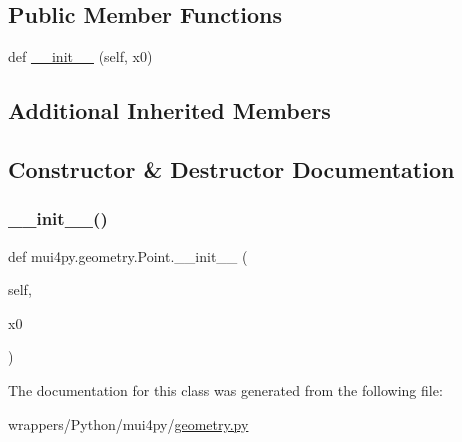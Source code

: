 \subsection*{Public Member Functions}
\begin{DoxyCompactItemize}
\item 
def \hyperlink{classmui4py_1_1geometry_1_1_point_a45dff6ac5f44fac1ee93e62908e3b563}{\+\_\+\+\_\+init\+\_\+\+\_\+} (self, x0)
\end{DoxyCompactItemize}
\subsection*{Additional Inherited Members}


\subsection{Constructor \& Destructor Documentation}
\mbox{\label{classmui4py_1_1geometry_1_1_point_a45dff6ac5f44fac1ee93e62908e3b563}} 
\subsubsection{\texorpdfstring{\+\_\+\+\_\+init\+\_\+\+\_\+()}{\_\_init\_\_()}}
{\footnotesize\ttfamily def mui4py.\+geometry.\+Point.\+\_\+\+\_\+init\+\_\+\+\_\+ (\begin{DoxyParamCaption}\item[{}]{self,  }\item[{}]{x0 }\end{DoxyParamCaption})}



The documentation for this class was generated from the following file\+:\begin{DoxyCompactItemize}
\item 
wrappers/\+Python/mui4py/\hyperlink{geometry_8py}{geometry.\+py}\end{DoxyCompactItemize}
